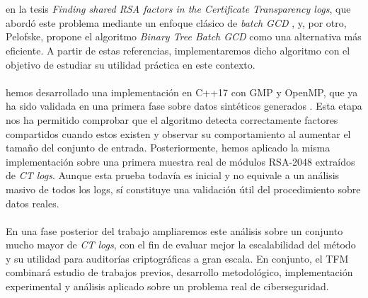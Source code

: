 

\\
\\
 en la tesis \textit{Finding shared RSA factors in the Certificate Transparency logs}, que abordó este problema mediante un enfoque clásico de \textit{batch GCD} , y, por otro, Pelofske, propone el algoritmo \textit{Binary Tree Batch GCD} como una alternativa más eficiente. A partir de estas referencias, implementaremos dicho algoritmo con el objetivo de estudiar su utilidad práctica en este contexto.
\\
\\
 hemos desarrollado una implementación en C++17 con GMP y OpenMP, que ya ha sido validada en una primera fase sobre datos sintéticos generados . Esta etapa nos ha permitido comprobar que el algoritmo detecta correctamente factores compartidos cuando estos existen y observar su comportamiento   al aumentar el tamaño del conjunto de entrada.
Posteriormente, hemos aplicado la misma implementación sobre una primera muestra real de módulos RSA-2048 extraídos de \textit{CT logs}. Aunque esta prueba todavía es inicial y no equivale a un análisis masivo de todos los logs, sí constituye una validación útil del procedimiento sobre datos reales.
\\
\\
En una fase posterior del trabajo ampliaremos este análisis sobre un conjunto mucho mayor de \textit{CT logs}, con el fin de evaluar mejor la escalabilidad del método y su utilidad para auditorías criptográficas a gran escala. En conjunto, el TFM combinará estudio de trabajos previos, desarrollo metodológico, implementación experimental y análisis aplicado sobre un problema real de ciberseguridad. 



